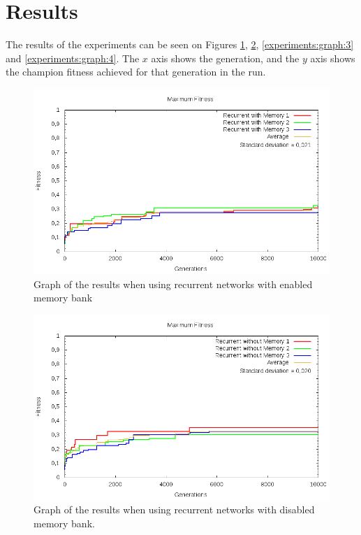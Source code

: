 
\section{Results}
The results of the experiments can be seen on Figures \ref{experiments:graph:1}, \ref{experiments:graph:2}, \ref{experiments:graph:3} and \ref{experiments:graph:4}. The $x$ axis shows the generation, and the $y$ axis shows the champion fitness achieved for that generation in the run.

\begin{figure}[H]
	\includegraphics[width=\textwidth]{figures/recurrentmemory.png}
\caption{Graph of the results when using recurrent networks with enabled memory bank}
	\label{experiments:graph:1}
\end{figure}
\begin{figure}[H]
	\includegraphics[width=\textwidth]{figures/recurrentnomemory.png}
	\caption{Graph of the results when using recurrent networks with disabled memory bank.}
		\label{experiments:graph:2}
\end{figure}

